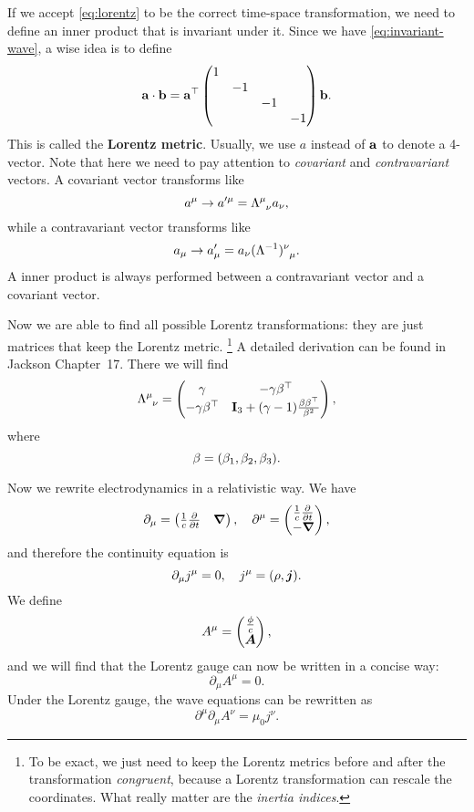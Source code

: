 \documentclass[hyperref, a4paper]{article}
\newcommand*{\concept}[1]{{\textbf{#1}}}
\begin{document}
If we accept \eqref{eq:lorentz} to be the correct time-space transformation, we need to define an inner product 
that is invariant under it. Since we have \eqref{eq:invariant-wave}, a wise idea is to define 
\begin{equation}
    \vb{a} \cdot \vb{b} = \vb{a}^\top \pmqty{\dmat{1, -1, -1, -1}} \vb{b}.
\end{equation}
This is called the \concept{Lorentz metric}. Usually, we use $a$ instead of $\vb{a}$ to denote a 4-vector. 
Note that here we need to pay attention to \emph{covariant} and \emph{contravariant} vectors.
A covariant vector transforms like 
\begin{equation}
    a^\mu \to a'^\mu = \Lambda\indices{^\mu_\nu} a_\nu,
\end{equation}
while a contravariant vector transforms like 
\begin{equation}
    a_\mu \to a'_\mu = a_\nu (\Lambda^{-1})\indices{^\nu_\mu}.
\end{equation}
A inner product is always performed between a contravariant vector and a covariant vector.

Now we are able to find all possible Lorentz transformations: they are just matrices that keep the 
Lorentz metric.%
\footnote{To be exact, we just need to keep the Lorentz metrics before and after the transformation 
\emph{congruent}, because a Lorentz transformation can rescale the coordinates. What really matter
are the \emph{inertia indices}.}
A detailed derivation can be found in Jackson Chapter~17. There we will find 
\begin{equation}
    \Lambda\indices{^\mu_\nu} = \pmqty{\gamma & - \gamma \vb{\beta}^\top \\ - \gamma \vb{\beta}^\top & \vb{I}_3 + (\gamma - 1) \frac{\vb{\beta} \vb{\beta}^\top}{\beta^2}},
\end{equation}
where 
\begin{equation}
    \vb{\beta} = (\beta_1, \beta_2, \beta_3).
\end{equation}

Now we rewrite electrodynamics in a relativistic way. We have 
\begin{equation}
    \partial_\mu = \pmqty{ \frac{1}{c} \pdv{t} & \grad }, \quad \partial^\mu = \pmqty{ \frac{1}{c} \pdv{t} \\ - \grad },
\end{equation}
and therefore the continuity equation is 
\begin{equation}
    \partial_\mu j^\mu = 0, \quad j^\mu = (\rho, \vb*{j}).
\end{equation}
We define 
\begin{equation}
    A^\mu = \pmqty{\frac{\phi}{c} \\ \vb*{A}}, 
\end{equation}
and we will find that the Lorentz gauge can now be written in a concise way:
\begin{equation}
    \partial_\mu A^\mu = 0.
\end{equation} 
Under the Lorentz gauge, the wave equations can be rewritten as
\begin{equation}
    \partial^\mu \partial_\mu A^\nu = \mu_0 j^\nu.
\end{equation}
\end{document}
